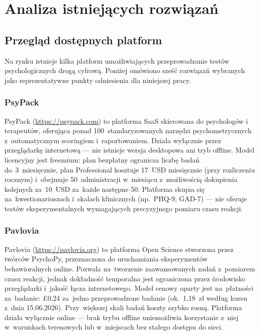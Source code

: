 \documentclass[12pt, a4paper, oneside]{report}
\begin{document}
\section{Analiza istniejących rozwiązań}
\label{sec:analiza}

\subsection{Przegląd dostępnych platform}
\label{subsec:przeglad}

Na rynku istnieje kilka platform umożliwiających przeprowadzanie testów
psychologicznych drogą cyfrową. Poniżej omówiono sześć rozwiązań
wybranych jako reprezentatywne punkty odniesienia dla niniejszej pracy.

\subsubsection{PsyPack}

PsyPack (\url{https://psypack.com}) to platforma SaaS skierowana do
psychologów i terapeutów, oferująca ponad 100~standaryzowanych narzędzi
psychometrycznych z~automatycznym scoringiem i~raportowaniem.
Działa wyłącznie przez przeglądarkę internetową --- nie istnieje wersja
desktopowa ani tryb offline.
Model licencyjny jest freemium: plan bezpłatny ogranicza liczbę badań
do~3~miesięcznie, plan Professional kosztuje 17~USD miesięcznie
(przy rozliczeniu rocznym) i~obejmuje 50~administracji w~miesiącu
z~możliwością dokupienia kolejnych za~10~USD za~każde następne 50.
Platforma skupia się na~kwestionariuszach i~skalach klinicznych
(np.~PHQ-9, GAD-7) --- nie oferuje testów eksperymentalnych wymagających
precyzyjnego pomiaru czasu reakcji.

\subsubsection{Pavlovia}

Pavlovia (\url{https://pavlovia.org}) to platforma Open Science stworzona
przez twórców PsychoPy, przeznaczona do uruchamiania eksperymentów
behawioralnych online. Pozwala na~tworzenie zaawansowanych zadań
z~pomiarem czasu reakcji, jednak dokładność temporalna jest ograniczona
przez środowisko przeglądarki i~jakość łącza internetowego.
Model cenowy oparty jest na~płatności za~badanie: £0,24 za~jedno
przeprowadzone badanie (ok.~1,18~zł według kursu z~dnia 15.06.2026).
Przy~większej skali badań koszty szybko rosną.
Platforma działa wyłącznie online --- brak trybu offline uniemożliwia
korzystanie z~niej w~warunkach terenowych lub w~miejscach bez stałego
dostępu do sieci.
\end{document}
